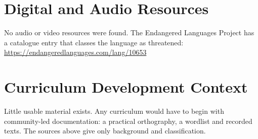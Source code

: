\documentclass[12pt]{article}
\begin{document}
\section{Digital and Audio Resources}
No audio or video resources were found. The Endangered Languages Project has a catalogue entry that classes the language as threatened: \url{https://endangeredlanguages.com/lang/10653}

\section{Curriculum Development Context}
Little usable material exists. Any curriculum would have to begin with community-led documentation: a practical orthography, a wordlist and recorded texts. The sources above give only background and classification.
\end{document}
